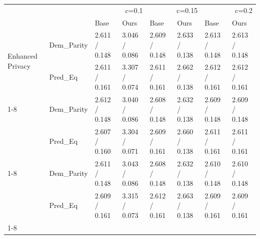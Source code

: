 \begin{tabular}{llllllll}
\toprule
 &  & \multicolumn{2}{r}{c=0.1} & \multicolumn{2}{r}{c=0.15} & \multicolumn{2}{r}{c=0.2} \\
 &  & Base & Ours & Base & Ours & Base & Ours \\
\midrule
\multirow[t]{2}{*}{Enhanced Privacy} & Dem_Parity & 2.611 / 0.148 & 3.046 / 0.086 & 2.609 / 0.148 & 2.633 / 0.138 & 2.613 / 0.148 & 2.613 / 0.148 \\
 & Pred_Eq & 2.611 / 0.161 & 3.307 / 0.074 & 2.611 / 0.161 & 2.662 / 0.138 & 2.612 / 0.161 & 2.612 / 0.161 \\
\cline{1-8}
\multirow[t]{2}{*}{Hybrid (50-50)} & Dem_Parity & 2.612 / 0.148 & 3.040 / 0.086 & 2.608 / 0.148 & 2.632 / 0.138 & 2.609 / 0.148 & 2.609 / 0.148 \\
 & Pred_Eq & 2.607 / 0.160 & 3.304 / 0.071 & 2.609 / 0.161 & 2.660 / 0.138 & 2.611 / 0.161 & 2.611 / 0.161 \\
\cline{1-8}
\multirow[t]{2}{*}{Communication Efficient} & Dem_Parity & 2.611 / 0.148 & 3.043 / 0.086 & 2.608 / 0.148 & 2.632 / 0.138 & 2.610 / 0.148 & 2.610 / 0.148 \\
 & Pred_Eq & 2.609 / 0.161 & 3.315 / 0.073 & 2.612 / 0.161 & 2.663 / 0.138 & 2.609 / 0.161 & 2.609 / 0.161 \\
\cline{1-8}
\bottomrule
\end{tabular}
